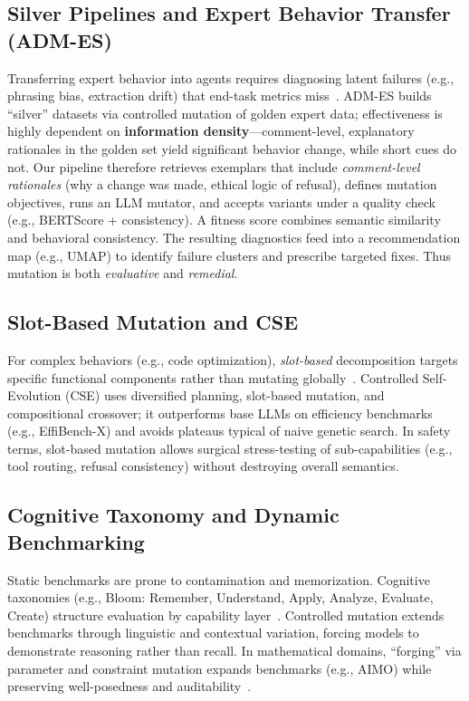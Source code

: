 \documentclass[letterpaper,twocolumn,10pt]{article}
\begin{document}
\subsection{Silver Pipelines and Expert Behavior Transfer (ADM-ES)}

Transferring expert behavior into agents requires diagnosing latent failures (e.g., phrasing bias, extraction drift) that end-task metrics miss~\cite{adm-es-arxiv}. ADM-ES builds ``silver'' datasets via controlled mutation of golden expert data; effectiveness is highly dependent on \textbf{information density}---comment-level, explanatory rationales in the golden set yield significant behavior change, while short cues do not. Our pipeline therefore retrieves exemplars that include \emph{comment-level rationales} (why a change was made, ethical logic of refusal), defines mutation objectives, runs an LLM mutator, and accepts variants under a quality check (e.g., BERTScore + consistency). A fitness score combines semantic similarity and behavioral consistency. The resulting diagnostics feed into a recommendation map (e.g., UMAP) to identify failure clusters and prescribe targeted fixes. Thus mutation is both \emph{evaluative} and \emph{remedial}.

\subsection{Slot-Based Mutation and CSE}

For complex behaviors (e.g., code optimization), \emph{slot-based} decomposition targets specific functional components rather than mutating globally~\cite{cse-evocontrol,cse-arxiv}. Controlled Self-Evolution (CSE) uses diversified planning, slot-based mutation, and compositional crossover; it outperforms base LLMs on efficiency benchmarks (e.g., EffiBench-X) and avoids plateaus typical of naive genetic search. In safety terms, slot-based mutation allows surgical stress-testing of sub-capabilities (e.g., tool routing, refusal consistency) without destroying overall semantics.

\subsection{Cognitive Taxonomy and Dynamic Benchmarking}

Static benchmarks are prone to contamination and memorization. Cognitive taxonomies (e.g., Bloom: Remember, Understand, Apply, Analyze, Evaluate, Create) structure evaluation by capability layer~\cite{bloom-bugreport}. Controlled mutation extends benchmarks through linguistic and contextual variation, forcing models to demonstrate reasoning rather than recall. In mathematical domains, ``forging'' via parameter and constraint mutation expands benchmarks (e.g., AIMO) while preserving well-posedness and auditability~\cite{aimo-benchmark}.
\end{document}

